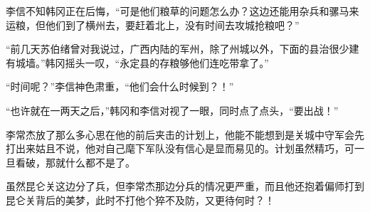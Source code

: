 李信不知韩冈正在后悔，“可是他们粮草的问题怎么办？这边还能用杂兵和骡马来运粮，但他们到了横州去，要赶着北上，没有时间去攻城抢粮吧？”

“前几天苏伯绪曾对我说过，广西内陆的军州，除了州城以外，下面的县治很少建有城墙。”韩冈摇头一叹，“永定县的存粮够他们连吃带拿了。”

“时间呢？”李信神色肃重，“他们会什么时候到？！”

“也许就在一两天之后，”韩冈和李信对视了一眼，同时点了点头，“要出战！”

李常杰放了那么多心思在他的前后夹击的计划上，他能不能想到是关城中守军会先打出来姑且不说，他对自己麾下军队没有信心是显而易见的。计划虽然精巧，可一旦看破，那就什么都不是了。

虽然昆仑关这边分了兵，但李常杰那边分兵的情况更严重，而且他还抱着偏师打到昆仑关背后的美梦，此时不打他个猝不及防，又更待何时？！

